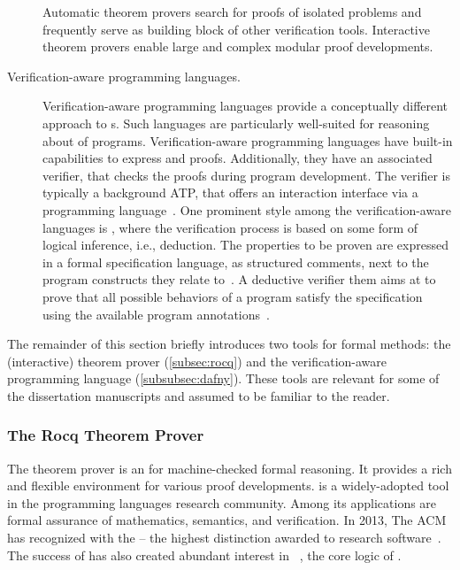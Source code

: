 \begin{description}
Automatic theorem provers search for proofs of
isolated problems and frequently serve as building block of other verification
tools. Interactive theorem provers enable
large and complex modular proof developments.

\item[Verification-aware programming languages.]
Verification-aware programming languages provide a conceptually different
approach to s. Such languages are particularly well-suited
for reasoning about  of programs. Verification-aware
programming languages have built-in capabilities to express 
and proofs. Additionally, they have an associated verifier, that checks the
proofs during program development. The verifier is typically a background ATP,
that offers an interaction interface via a programming
language~\cite{leino2023}. One prominent style among the verification-aware
languages is \emph{}, where the verification process
is based on some form of logical inference, i.e., deduction. The properties to
be proven are expressed in a formal specification language, as structured
comments, next to the program constructs they relate to~\cite{hahnle2019}. A
deductive verifier them aims at to prove that all possible behaviors of a
program satisfy the specification using the available program
annotations~\cite{cassez2022}.
\end{description}

The remainder of this section briefly introduces two tools for formal methods:
the (interactive)  theorem prover (\autoref{subsec:rocq}) and the
verification-aware programming language  (\autoref{subsubsec:dafny}).
These tools are relevant for some of the dissertation manuscripts and assumed to
be familiar to the reader.

\subsubsection{The Rocq Theorem Prover}
\label{subsec:rocq}

The  theorem prover is an  for
machine-checked formal reasoning. It provides a rich and flexible environment
for various proof developments.  is a widely-adopted tool in the
programming languages research community. Among its applications are formal
assurance of mathematics, semantics, and verification. In 2013, The ACM has
recognized  with the
\href{https://awards.acm.org/software-system}{} --
the highest distinction awarded to research software~\cite{rocq-community}. The
success of  has also created abundant interest in ~\cite{coquand1988}, \ie the core logic of .

